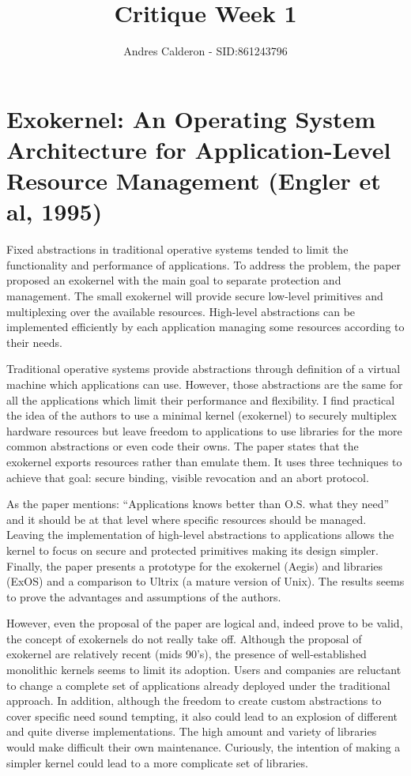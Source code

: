 \documentclass[a4paper,10pt]{scrartcl}
\title{Critique Week 1}
\author{Andres Calderon - SID:861243796}
\begin{document}
\maketitle
\section*{Exokernel: An Operating System Architecture for Application-Level Resource Management (Engler et al, 1995)}
Fixed abstractions in traditional operative systems tended to limit the functionality and performance of applications.  To address the problem, the paper proposed an exokernel with the main goal to separate protection and management.  The small exokernel will provide secure low-level primitives and multiplexing over the available resources.  High-level abstractions can be implemented efficiently by each application managing some resources according to their needs.

Traditional operative systems provide abstractions through definition of a virtual machine which applications can use.  However, those abstractions are the same for all the applications which limit their performance and flexibility.  I find practical the idea of the authors to use a minimal kernel (exokernel) to securely multiplex hardware resources but leave freedom to applications to use libraries for the more common abstractions or even code their owns. The paper states that the exokernel exports resources rather than emulate them.  It uses three techniques to achieve that goal: secure binding, visible revocation and an abort protocol.

As the paper mentions: ``Applications knows better than O.S. what they need'' and it should be at that level where specific resources should be managed.  Leaving the implementation of high-level abstractions to applications allows the kernel to focus on secure and protected primitives making its design simpler. Finally, the paper presents a prototype for the exokernel (Aegis) and libraries (ExOS) and a comparison to Ultrix (a mature version of Unix). The results seems to prove the advantages and assumptions of the authors.

However, even the proposal of the paper are logical and, indeed prove to be valid,  the concept of exokernels do not really take off.  Although the proposal of exokernel are relatively recent (mids 90's), the presence of well-established monolithic kernels seems to limit its adoption.  Users and companies are reluctant to change a complete set of applications already deployed under the traditional approach.  In addition, although the freedom to create custom abstractions to cover specific need sound tempting, it also could lead to an explosion of different and quite diverse implementations.  The high amount and variety of libraries would make difficult their own maintenance.  Curiously, the intention of making a simpler kernel could lead to a more complicate set of libraries.

\end{document}
